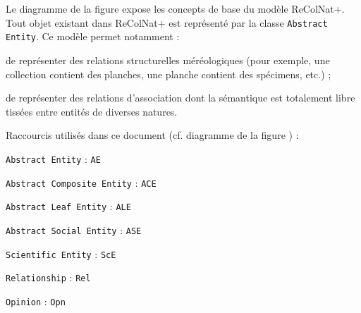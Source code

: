 \startsection[title={Éléments de modélisation}]

Le diagramme de la figure  expose les concepts de base du modèle ReColNat+.
Tout objet existant dans ReColNat+ est représenté par la classe {\tt Abstract Entity}.
Ce modèle permet notamment :

\startitemize
	\item
	de représenter des relations structurelles méréologiques (pour exemple, une collection contient des planches, une planche contient des spécimens, etc.) ;
	\item
	de représenter des relations d'association dont la sémantique est totalement libre tissées entre entités de diverses natures.
\stopitemize


Raccourcis utilisés dans ce document (cf. diagramme de la figure ) :

\startitemize
	\item {\tt Abstract Entity} : {\tt AE}
	\item {\tt Abstract Composite Entity} : {\tt ACE}
	\item {\tt Abstract Leaf Entity} : {\tt ALE}
	\item {\tt Abstract Social Entity} : {\tt ASE}
	\item {\tt Scientific Entity} : {\tt ScE}
	\item {\tt Relationship} : {\tt Rel}
	\item {\tt Opinion} : {\tt Opn}
\stopitemize